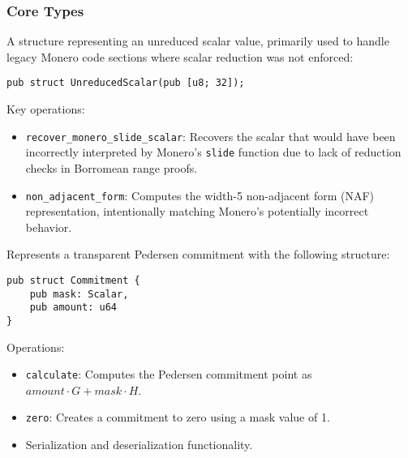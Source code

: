 
\subsubsection{Core Types}

A structure representing an unreduced scalar value, primarily used to handle legacy Monero code sections where scalar reduction was not enforced: 



\begin{verbatim}
pub struct UnreducedScalar(pub [u8; 32]);
\end{verbatim}

Key operations:
\begin{itemize}
  \item \texttt{recover\_monero\_slide\_scalar}: Recovers the scalar that would have been incorrectly interpreted by Monero's \texttt{slide} function due to lack of reduction checks in Borromean range proofs. %
  \item \texttt{non\_adjacent\_form}: Computes the width-5 non-adjacent form (NAF) representation, intentionally matching Monero's potentially incorrect behavior. %
\end{itemize}

Represents a transparent Pedersen commitment with the following structure: %

\begin{verbatim}
pub struct Commitment {
    pub mask: Scalar,
    pub amount: u64
}
\end{verbatim}

Operations:
\begin{itemize}
  \item \texttt{calculate}: Computes the Pedersen commitment point as $amount \cdot G + mask \cdot H$.  %
  \item \texttt{zero}: Creates a commitment to zero using a mask value of 1.  %
  \item Serialization and deserialization functionality.
\end{itemize}

